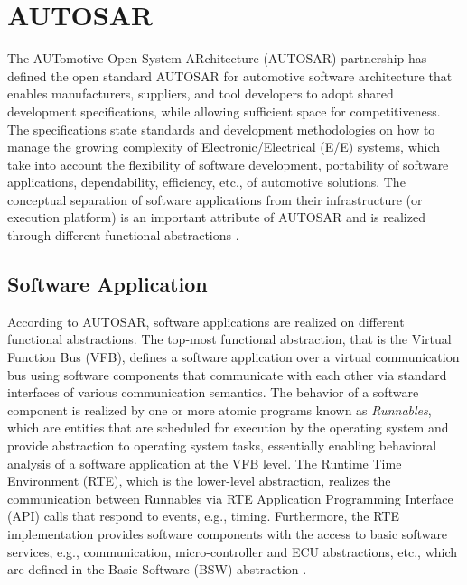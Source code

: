 \section{AUTOSAR}\label{sec_autosar}
The AUTomotive Open System ARchitecture (AUTOSAR) partnership has defined the open standard AUTOSAR for automotive software architecture that enables manufacturers, suppliers, and tool developers to adopt shared development specifications, while allowing sufficient space for competitiveness. The specifications state standards and development methodologies on how to manage the growing complexity of Electronic/Electrical (E/E) systems, which take into account the flexibility of software development, portability of software applications, dependability, efficiency, etc., of automotive solutions. The conceptual separation of software applications from their infrastructure (or execution platform) is an important attribute of AUTOSAR and is realized through different functional abstractions \cite{NaumannAUTOSARBus}. 

\subsection{Software Application}
According to AUTOSAR, software applications are realized on different functional abstractions. The top-most functional abstraction, that is the Virtual Function Bus (VFB), defines a software application over a virtual communication bus using software components that communicate with each other via standard interfaces of various communication semantics. The behavior of a software component is realized by one or more atomic programs known as \textit{Runnables}, which are entities that are scheduled for execution by the operating system and provide abstraction to operating system tasks, essentially enabling behavioral analysis of a software application at the VFB level. The Runtime Time Environment (RTE), which is the lower-level abstraction, realizes the communication between Runnables via RTE Application Programming Interface (API) calls that respond to events, e.g., timing. Furthermore, the RTE implementation provides software components with the access to basic software services, e.g., communication, micro-controller and ECU abstractions, etc., which are defined in the Basic Software (BSW) abstraction \cite{NaumannAUTOSARBus}. 

